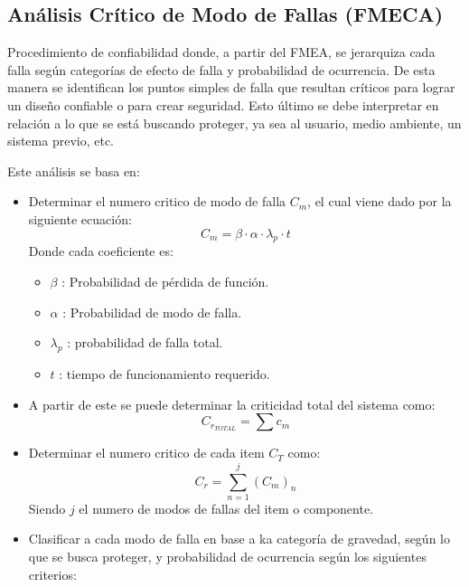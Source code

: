 \documentclass{article}
\begin{document}
\subsection{Análisis Crítico de Modo de Fallas (FMECA)}

Procedimiento de confiabilidad donde, a partir del FMEA, se jerarquiza cada falla según categorías de efecto de falla y probabilidad de ocurrencia. De esta manera se identifican los puntos simples de falla que resultan críticos para lograr un diseño confiable o para crear seguridad. Esto último se debe interpretar en relación a lo que se está buscando proteger, ya sea al usuario, medio ambiente, un sistema previo, etc. 

Este análisis se basa en:

\begin{itemize}
	\item Determinar el numero critico de modo de falla $C_m$, el cual viene dado por la siguiente ecuación:
		\begin{equation}
			C_m = \beta \cdot \alpha \cdot \lambda_{p} \cdot t
		\end{equation}
	Donde cada coeficiente es:
	\begin{itemize}
	  \item $\beta$ : Probabilidad de pérdida de función.
	  \item $\alpha$ : Probabilidad de modo de falla.
	  \item $\lambda_{p}$ : probabilidad de falla total.
	  \item $t$ : tiempo de funcionamiento requerido.
	\end{itemize}
	
  \item A partir de este se puede determinar la criticidad total del sistema como:
  \begin{equation}
	  C_{r_{TOTAL}} = \sum{c_m} 
  \end{equation}
 
  \item Determinar el numero critico de cada item $C_T$ como:
	  \begin{equation}
		  C_r = \sum_{n=1}^{j}{(C_m)_n}
	  \end{equation}
	  Siendo $j$ el numero de modos de fallas del item o componente.

  \item	Clasificar a cada modo de falla en base a ka categoría de gravedad, según lo que se busca proteger, y probabilidad de ocurrencia según los siguientes criterios:


\end{itemize}
\end{document}
